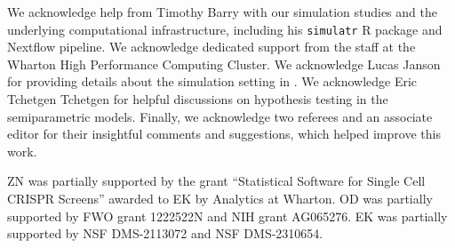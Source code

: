 \documentclass[aos]{imsart}
\theoremstyle{plain}
\theoremstyle{remark}
\begin{document}
\begin{acks}[Acknowledgments]
    We acknowledge help from Timothy Barry with our simulation studies and the underlying computational infrastructure, including his \verb|simulatr| R package and Nextflow pipeline. We acknowledge dedicated support from the staff at the Wharton High Performance Computing Cluster. We acknowledge Lucas Janson for providing details about the simulation setting in \citet{CetL16}. We acknowledge Eric Tchetgen Tchetgen for helpful discussions on hypothesis testing in the semiparametric models. Finally, we acknowledge two referees and an associate editor for their insightful comments and suggestions, which helped improve this work.
    \end{acks}
    \begin{funding}
        ZN was partially supported by the grant ``Statistical Software for Single Cell CRISPR Screens'' awarded to EK by Analytics at Wharton. OD was partially supported by FWO grant 1222522N and NIH grant AG065276. EK was partially supported by NSF DMS-2113072 and NSF DMS-2310654.  
    \end{funding}
    
    
\end{document}
